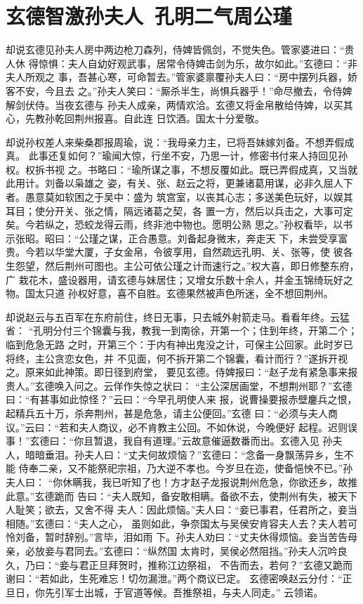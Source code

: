 \chapter{玄德智激孙夫人~孔明二气周公瑾}

却说玄德见孙夫人房中两边枪刀森列，侍婢皆佩剑，不觉失色。管家婆进曰：“贵人休
得惊惧：夫人自幼好观武事，居常令侍婢击剑为乐，故尔如此。”玄德曰：“非夫人所观之
事，吾甚心寒，可命暂去。”管家婆禀覆孙夫人曰：“房中摆列兵器，娇客不安，今且去
之。”孙夫人笑曰：“厮杀半生，尚惧兵器乎！”命尽撤去，令侍婢解剑伏侍。当夜玄德与
孙夫人成亲，两情欢洽。玄德又将金帛散给侍婢，以买其心，先教孙乾回荆州报喜。自此连
日饮酒。国太十分爱敬。

却说孙权差人来柴桑郡报周瑜，说：“我母亲力主，已将吾妹嫁刘备。不想弄假成真。
此事还复如何？”瑜闻大惊，行坐不安，乃思一计，修密书付来人持回见孙权。权拆书视
之。书略曰：“瑜所谋之事，不想反覆如此。既已弄假成真，又当就此用计。刘备以枭雄之
姿，有关、张、赵云之将，更兼诸葛用谋，必非久屈人下者。愚意莫如软困之于吴中：盛为
筑宫室，以丧其心志；多送美色玩好，以娱其耳目；使分开关、张之情，隔远诸葛之契，各
置一方，然后以兵击之，大事可定矣。今若纵之，恐蛟龙得云雨，终非池中物也。愿明公熟
思之。”孙权看毕，以书示张昭。昭曰：“公瑾之谋，正合愚意。刘备起身微末，奔走天
下，未尝受享富贵。今若以华堂大厦，子女金帛，令彼享用，自然疏远孔明、关、张等，使
彼各生怨望，然后荆州可图也。主公可依公瑾之计而速行之。”权大喜，即日修整东府，广
栽花木，盛设器用，请玄德与妹居住；又增女乐数十余人，并金玉锦绮玩好之物。国太只道
孙权好意，喜不自胜。玄德果然被声色所迷，全不想回荆州。

却说赵云与五百军在东府前住，终日无事，只去城外射箭走马。看看年终。云猛省：
“孔明分付三个锦囊与我，教我一到南徐，开第一个；住到年终，开第二个；临到危急无路
之时，开第三个：于内有神出鬼没之计，可保主公回家。此时岁已将终，主公贪恋女色，并
不见面，何不拆开第二个锦囊，看计而行？”遂拆开视之。原来如此神策。即日径到府堂，
要见玄德。侍婢报曰：“赵子龙有紧急事来报贵人。”玄德唤入问之。云佯作失惊之状曰：
“主公深居画堂，不想荆州耶？”玄德曰：“有甚事如此惊怪？”云曰：“今早孔明使人来
报，说曹操要报赤壁鏖兵之恨，起精兵五十万，杀奔荆州，甚是危急，请主公便回。”玄德
曰：“必须与夫人商议。”云曰：“若和夫人商议，必不肯教主公回。不如休说，今晚便好
起程。迟则误事！”玄德曰：“你且暂退，我自有道理。”云故意催逼数番而出。玄德入见
孙夫人，暗暗垂泪。孙夫人曰：“丈夫何故烦恼？”玄德曰：“念备一身飘荡异乡，生不能
侍奉二亲，又不能祭祀宗祖，乃大逆不孝也。今岁旦在迩，使备悒怏不已。”孙夫人曰：
“你休瞒我，我已听知了也！方才赵子龙报说荆州危急，你欲还乡，故推此意。”玄德跪而
告曰：“夫人既知，备安敢相瞒。备欲不去，使荆州有失，被天下人耻笑；欲去，又舍不得
夫人：因此烦恼。”夫人曰：“妾已事君，任君所之，妾当相随。”玄德曰：“夫人之心，
虽则如此，争奈国太与吴侯安肯容夫人去？夫人若可怜刘备，暂时辞别。”言毕，泪如雨
下。孙夫人劝曰：“丈夫休得烦恼。妾当苦告母亲，必放妾与君同去。”玄德曰：“纵然国
太肯时，吴侯必然阻挡。”孙夫人沉吟良久，乃曰：“妾与君正旦拜贺时，推称江边祭祖，
不告而去，若何？”玄德又跪而谢曰：“若如此，生死难忘！切勿漏泄。”两个商议已定。
玄德密唤赵云分付：“正旦日，你先引军士出城，于官道等候。吾推祭祖，与夫人同走。”
云领诺。

